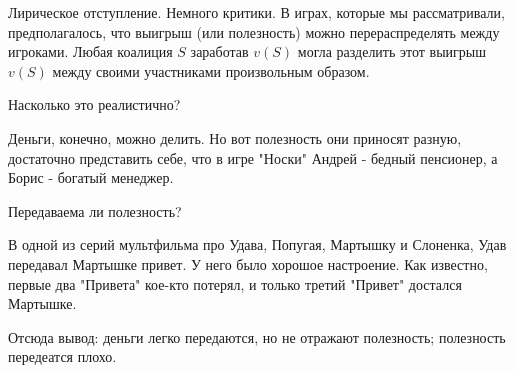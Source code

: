 \documentclass[pdftex,12pt,a4paper]{article}
\numberwithin{equation}{page} %
\theoremstyle{definition} %
\theoremstyle{definition}
\theoremstyle{definition}
\begin{document}
Лирическое отступление. Немного критики. В играх, которые мы рассматривали, предполагалось, что выигрыш (или полезность) можно перераспределять между игроками. Любая коалиция $S$ заработав $v(S)$ могла разделить этот выигрыш $v(S)$ между своими участниками произвольным образом. 

Насколько это реалистично? 

Деньги, конечно, можно делить. Но вот полезность они приносят разную, достаточно представить себе, что в игре "Носки" Андрей - бедный пенсионер, а Борис - богатый менеджер. 

Передаваема ли полезность? 

В одной из серий мультфильма про Удава, Попугая, Мартышку и Слоненка, Удав передавал Мартышке привет. У него было хорошое настроение. Как известно, первые два "Привета" кое-кто потерял, и только третий "Привет" достался Мартышке.

Отсюда вывод: деньги легко передаются, но не отражают полезность; полезность передеатся плохо.
\end{document}
